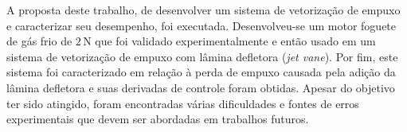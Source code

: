 A proposta deste trabalho, de desenvolver um sistema de vetorização de empuxo e caracterizar seu desempenho, foi executada. Desenvolveu-se um motor foguete de gás frio de \(2\,\mathrm{N} \) que foi validado experimentalmente e então usado em um sistema de vetorização de empuxo com lâmina defletora (\textit{jet vane}). Por fim, este sistema foi caracterizado em relação à perda de empuxo causada pela adição da lâmina defletora e suas derivadas de controle foram obtidas. Apesar do objetivo ter sido atingido, foram encontradas várias dificuldades e fontes de erros experimentais que devem ser abordadas em trabalhos futuros.